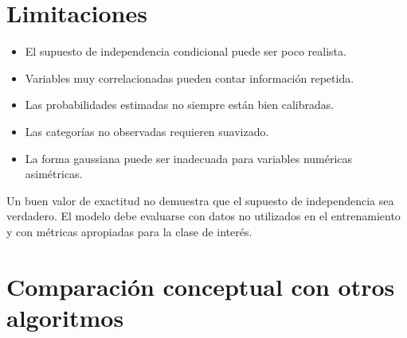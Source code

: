 \documentclass[
  spanish,
  10.5pt,
  letterpaper,
  openany,
  headings=big]{scrbook}
\providecommand{\tightlist}{%
  \setlength{\itemsep}{0pt}\setlength{\parskip}{0pt}}
\begin{document}
\section{Limitaciones}\label{limitaciones-1}

\begin{itemize}
\tightlist
\item
  El supuesto de independencia condicional puede ser poco realista.
\item
  Variables muy correlacionadas pueden contar información repetida.
\item
  Las probabilidades estimadas no siempre están bien calibradas.
\item
  Las categorías no observadas requieren suavizado.
\item
  La forma gaussiana puede ser inadecuada para variables numéricas
  asimétricas.
\end{itemize}

\begin{tcolorbox}[enhanced jigsaw, arc=.35mm, bottomrule=.15mm, bottomtitle=1mm, breakable, colback=white, colbacktitle=quarto-callout-warning-color!10!white, colframe=quarto-callout-warning-color-frame, coltitle=black, left=2mm, leftrule=.75mm, opacityback=0, opacitybacktitle=0.6, rightrule=.15mm, title=\textcolor{quarto-callout-warning-color}{\faExclamationTriangle}\hspace{0.5em}{Precaución metodológica}, titlerule=0mm, toprule=.15mm, toptitle=1mm]

Un buen valor de exactitud no demuestra que el supuesto de independencia
sea verdadero. El modelo debe evaluarse con datos no utilizados en el
entrenamiento y con métricas apropiadas para la clase de interés.

\end{tcolorbox}

\section{Comparación conceptual con otros
algoritmos}\label{comparaciuxf3n-conceptual-con-otros-algoritmos}
\end{document}
